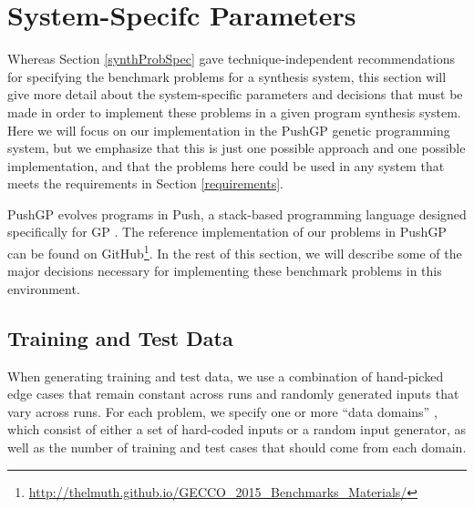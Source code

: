 \documentclass{sig-alternate}
\begin{document}
\section{System-Specifc Parameters} \label{systemParamsSection}

Whereas Section \ref{synthProbSpec} gave technique-independent recommendations for specifying the benchmark problems for a synthesis system, this section will give more detail about the system-specific parameters and decisions that must be made in order to implement these problems in a given program synthesis system. Here we will focus on our implementation in the PushGP genetic programming system, but we emphasize that this is just one possible approach and one possible implementation, and that the problems here could be used in any system that meets the requirements in Section \ref{requirements}.

PushGP evolves programs in Push, a stack-based programming language designed specifically for GP \cite{spector2:2001:gecco, spector:2002:GPEM, 1068292}. %
The reference implementation of our problems in PushGP can be found on GitHub\footnote{\url{http://thelmuth.github.io/GECCO_2015_Benchmarks_Materials/}}. In the rest of this section, we will describe some of the major decisions necessary for implementing these benchmark problems in this environment.

\subsection{Training and Test Data}

When generating training and test data, we use a combination of hand-picked edge cases that remain constant across runs and randomly generated inputs that vary across runs. For each problem, we specify one or more ``data domains'' \cite{Helmuth:2014:GECCO}, which consist of either a set of hard-coded inputs or a random input generator, as well as the number of training and test cases that should come from each domain. %
\end{document}
